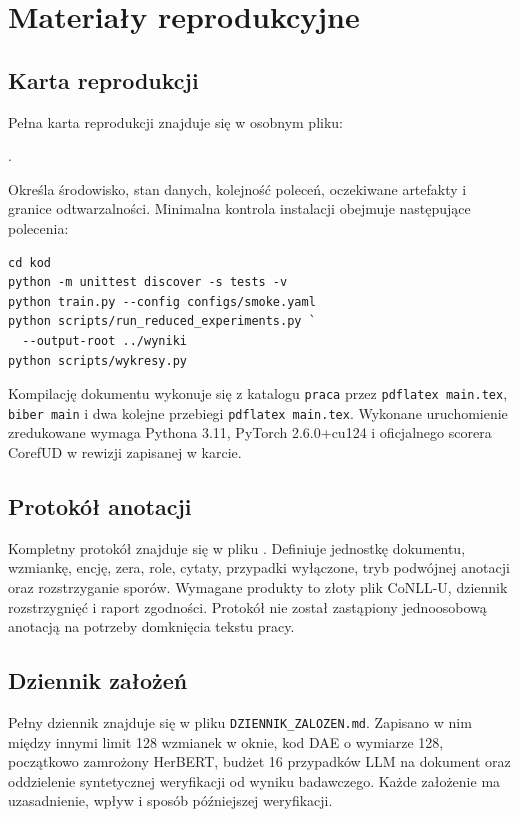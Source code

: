 \chapter{Materiały reprodukcyjne}
\label{app:reprodukcja}

\section{Karta reprodukcji}

Pełna karta reprodukcji znajduje się w osobnym pliku:
\begin{center}
  .
\end{center}
Określa środowisko, stan danych, kolejność poleceń, oczekiwane artefakty i granice odtwarzalności. Minimalna kontrola instalacji obejmuje następujące polecenia:

\begin{verbatim}
cd kod
python -m unittest discover -s tests -v
python train.py --config configs/smoke.yaml
python scripts/run_reduced_experiments.py `
  --output-root ../wyniki
python scripts/wykresy.py
\end{verbatim}

Kompilację dokumentu wykonuje się z katalogu \texttt{praca} przez \texttt{pdflatex main.tex}, \texttt{biber main} i dwa kolejne przebiegi \texttt{pdflatex main.tex}. Wykonane uruchomienie zredukowane wymaga Pythona 3.11, PyTorch 2.6.0+cu124 i oficjalnego scorera CorefUD w rewizji zapisanej w karcie.

\section{Protokół anotacji}

Kompletny protokół znajduje się w pliku . Definiuje jednostkę dokumentu, wzmiankę, encję, zera, role, cytaty, przypadki wyłączone, tryb podwójnej anotacji oraz rozstrzyganie sporów. Wymagane produkty to złoty plik CoNLL-U, dziennik rozstrzygnięć i raport zgodności. Protokół nie został zastąpiony jednoosobową anotacją na potrzeby domknięcia tekstu pracy.

\section{Dziennik założeń}

Pełny dziennik znajduje się w pliku \texttt{DZIENNIK\_ZALOZEN.md}. Zapisano w nim między innymi limit 128 wzmianek w oknie, kod DAE o wymiarze 128, początkowo zamrożony HerBERT, budżet 16 przypadków LLM na dokument oraz oddzielenie syntetycznej weryfikacji od wyniku badawczego. Każde założenie ma uzasadnienie, wpływ i sposób późniejszej weryfikacji.

